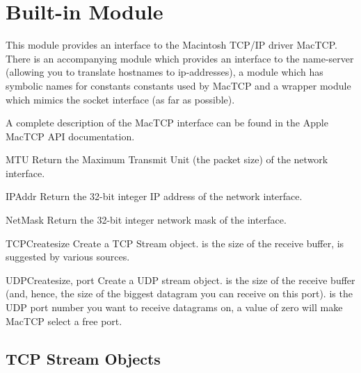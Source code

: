 \section{Built-in Module }

\renewcommand{\indexsubitem}{(in module mactcp)}

This module provides an interface to the Macintosh TCP/IP driver
MacTCP\@. There is an accompanying module  which provides an
interface to the name-server (allowing you to translate hostnames to
ip-addresses), a module  which has symbolic names for
constants constants used by MacTCP and a wrapper module 
which mimics the \UNIX{} socket interface (as far as possible).

A complete description of the MacTCP interface can be found in the
Apple MacTCP API documentation.

\begin{funcdesc}{MTU}{}
Return the Maximum Transmit Unit (the packet size) of the network
interface.
\end{funcdesc}

\begin{funcdesc}{IPAddr}{}
Return the 32-bit integer IP address of the network interface.
\end{funcdesc}

\begin{funcdesc}{NetMask}{}
Return the 32-bit integer network mask of the interface.
\end{funcdesc}

\begin{funcdesc}{TCPCreate}{size}
Create a TCP Stream object.  is the size of the receive
buffer,  is suggested by various sources.
\end{funcdesc}

\begin{funcdesc}{UDPCreate}{size, port}
Create a UDP stream object.  is the size of the receive
buffer (and, hence, the size of the biggest datagram you can receive
on this port).  is the UDP port number you want to receive
datagrams on, a value of zero will make MacTCP select a free port.
\end{funcdesc}

\subsection{TCP Stream Objects}

\renewcommand{\indexsubitem}{(TCP stream attribute)}


